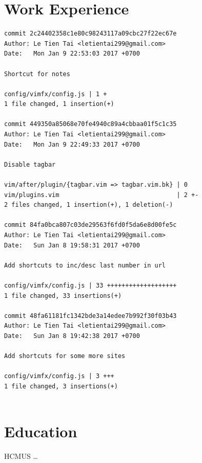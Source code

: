 \documentclass[a4paper]{article}
\begin{document}
\vspace{10pt}
\noindent
  \begin{minipage}[t]{0.6\textwidth}
    \section*{Work Experience}
    \begin{verbatim}
commit 2c24402358c1e80c98243117a09cbc27f22ec67e
Author: Le Tien Tai <letientai299@gmail.com>
Date:   Mon Jan 9 22:53:03 2017 +0700

Shortcut for notes

config/vimfx/config.js | 1 +
1 file changed, 1 insertion(+)

commit 449350a85068e70fe4940c89a4cbbaa01f5c1c35
Author: Le Tien Tai <letientai299@gmail.com>
Date:   Mon Jan 9 22:49:33 2017 +0700

Disable tagbar

vim/after/plugin/{tagbar.vim => tagbar.vim.bk} | 0
vim/plugins.vim                                | 2 +-
2 files changed, 1 insertion(+), 1 deletion(-)

commit 84fa0bca807c03de29563f6fd0f5da6e8d00fe5c
Author: Le Tien Tai <letientai299@gmail.com>
Date:   Sun Jan 8 19:58:31 2017 +0700

Add shortcuts to inc/desc last number in url

config/vimfx/config.js | 33 +++++++++++++++++++
1 file changed, 33 insertions(+)

commit 48fa61181fc1342bde3a14edee7b992f30f03b43
Author: Le Tien Tai <letientai299@gmail.com>
Date:   Sun Jan 8 19:42:38 2017 +0700

Add shortcuts for some more sites

config/vimfx/config.js | 3 +++
1 file changed, 3 insertions(+)


    \end{verbatim}

    \section*{Education}

    HCMUS
    \ldots
  \end{minipage}
\end{document}
